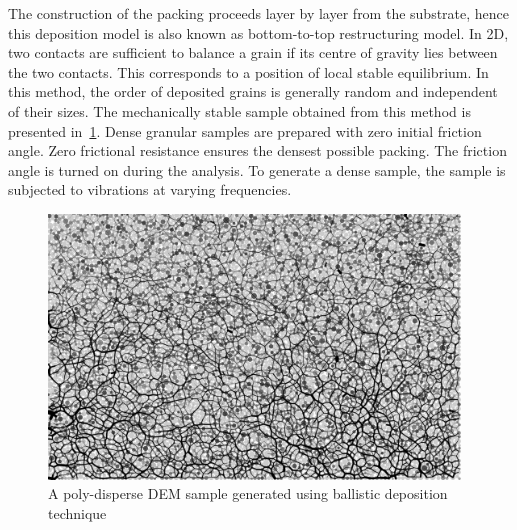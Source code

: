 The construction of the packing proceeds layer by layer from the 
substrate, hence this deposition model is also known as bottom-to-top 
restructuring model. 
%
%
In 2D, two contacts are sufficient to balance a grain if its 
centre of gravity lies between the two contacts. This corresponds to a position 
of local stable equilibrium. 
In this method, the order of deposited grains is generally random and 
independent of their sizes. The mechanically stable sample obtained from this 
method is presented in~\cref{fig:DEM_Sample_r6}. 
Dense granular samples are prepared with zero initial friction angle. Zero 
frictional resistance ensures the densest possible packing. The friction angle 
is turned on during the analysis. To generate a dense sample, the sample is 
subjected to vibrations at varying frequencies. 

\begin{figure}[htbp]
\centering
	\includegraphics[width=0.975\textwidth]{DEM_Sample_r6}
	\caption{A poly-disperse DEM sample generated using ballistic deposition 
	technique}
	\label{fig:DEM_Sample_r6}
\end{figure}

